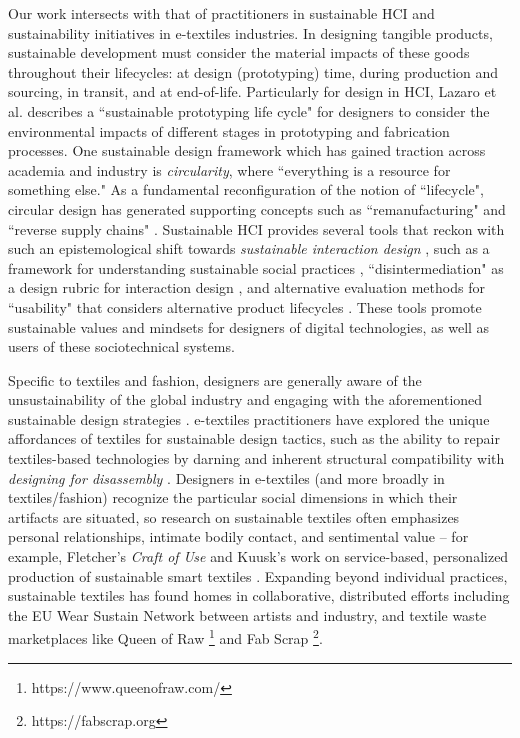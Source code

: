 Our work intersects with that of practitioners in sustainable HCI and sustainability initiatives in e-textiles industries. In designing tangible products, sustainable development must consider the material impacts of these goods throughout their lifecycles: at design (prototyping) time, during production and sourcing, in transit, and at end-of-life. Particularly for design in HCI, Lazaro et al. \cite{lazaro_sustainable_2020} describes a ``sustainable prototyping life cycle" for designers to consider the environmental impacts of different stages in prototyping and fabrication processes. One sustainable design framework which has gained traction across academia and industry is \textit{circularity}, where ``everything is a resource for something else." \cite{c2c_green_2017} As a fundamental reconfiguration of the notion of ``lifecycle", circular design has generated supporting concepts such as ``remanufacturing" \cite{nasr_fundamentals_2020} and ``reverse supply chains" \cite{battaia_reverse_2015}. Sustainable HCI provides several tools that reckon with such an epistemological shift towards \textit{sustainable interaction design} \cite{blevis_sustainable_2007}, such as a framework for understanding sustainable social practices \cite{entwistle_beyond_2015}, ``disintermediation" as a design rubric for interaction design \cite{raghavan_means_2017}, and alternative evaluation methods for ``usability" that considers alternative product lifecycles \cite{remy_evaluation_2018}. These tools promote sustainable values and mindsets for designers of digital technologies, as well as users of these sociotechnical systems. 

Specific to textiles and fashion, designers are generally aware of the unsustainability of the global industry and engaging with the aforementioned sustainable design strategies \cite{brydges_closing_2021, kohler_challenges_2013, veske_review_2020}. e-textiles practitioners have explored the unique affordances of textiles for sustainable design tactics, such as the ability to repair textiles-based technologies by darning \cite{jones_e-darning_2021} and inherent structural compatibility with \textit{designing for disassembly} \cite{wu_unfabricate_2020}. Designers in e-textiles (and more broadly in textiles/fashion) recognize the particular social dimensions in which their artifacts are situated, so research on sustainable textiles often emphasizes personal relationships, intimate bodily contact, and sentimental value -- for example, Fletcher's \textit{Craft of Use} \cite{fletcher_craft_2016} and Kuusk's work on service-based, personalized production of sustainable smart textiles \cite{kuusk_crafting_2015}. Expanding beyond individual practices, sustainable textiles has found homes in collaborative, distributed efforts including the EU Wear Sustain Network \cite{goodman_wear_2018} between artists and industry, and textile waste marketplaces like Queen of Raw \footnote{https://www.queenofraw.com/} and Fab Scrap \footnote{https://fabscrap.org}.

